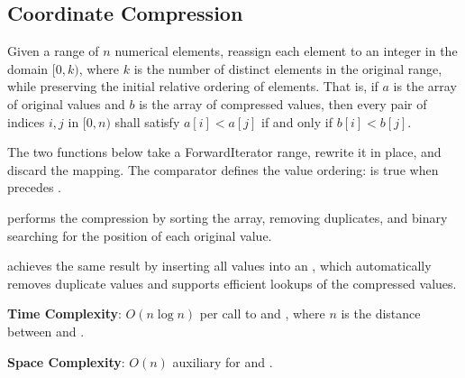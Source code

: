 \subsection{Coordinate Compression}
\label{sec:1.1.4}
Given a range of $n$ numerical elements, reassign each element to an integer in the domain $[0, k)$, where $k$ is the number of distinct elements in the original range, while preserving the initial relative ordering of elements. That is, if $a$ is the array of original values and $b$ is the array of compressed values, then every pair of indices $i, j$ in $[0, n)$ shall satisfy $a[i] < a[j]$ if and only if $b[i] < b[j]$.

The two functions below take a ForwardIterator range, rewrite it in place, and discard the mapping. The comparator  defines the value ordering:  is true when  precedes .

\begin{compactitem}
  \item {} performs the compression by sorting the array, removing duplicates, and binary searching for the position of each original value.
  \item {} achieves the same result by inserting all values into an , which automatically removes duplicate values and supports efficient lookups of the compressed values.
\end{compactitem}

\textbf{Time Complexity}: $O(n \log n)$ per call to  and , where $n$ is the distance between  and .

\textbf{Space Complexity}: $O(n)$ auxiliary for  and .

